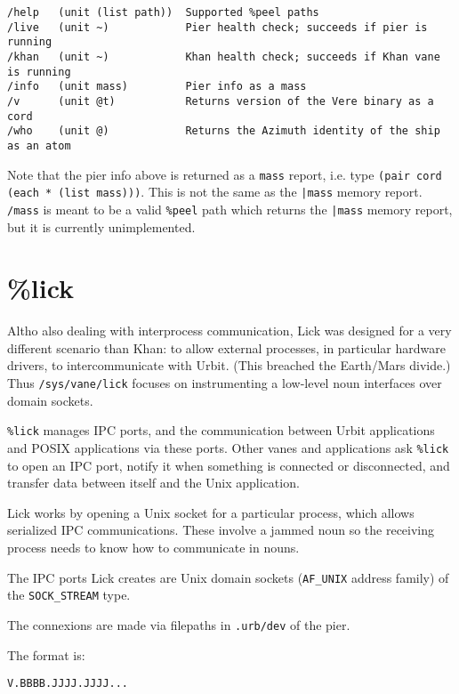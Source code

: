 \documentclass[twoside]{article}
\begin{document}
\begin{verbatim}
/help   (unit (list path))  Supported %peel paths
/live   (unit ~)            Pier health check; succeeds if pier is running
/khan   (unit ~)            Khan health check; succeeds if Khan vane is running
/info   (unit mass)         Pier info as a mass
/v      (unit @t)           Returns version of the Vere binary as a cord
/who    (unit @)            Returns the Azimuth identity of the ship as an atom
\end{verbatim}

Note that the pier info above is returned as a \texttt{mass} report, i.e. type \texttt{(pair cord (each * (list mass)))}. This is not the same as the \texttt{|mass} memory report. \texttt{/mass} is meant to be a valid \texttt{\%peel} path which returns the \texttt{|mass} memory report, but it is currently unimplemented.

\section{\%lick}

Altho also dealing with interprocess communication, Lick was designed for a very different scenario than Khan:  to allow external processes, in particular hardware drivers, to intercommunicate with Urbit.  (This breached the Earth/Mars divide.)  Thus \texttt{/sys/vane/lick} focuses on instrumenting a low-level noun interfaces over domain sockets.

\texttt{\%lick} manages IPC ports, and the communication between Urbit applications and POSIX applications via these ports. Other vanes and applications ask \texttt{\%lick} to open an IPC port, notify it when something is connected or disconnected, and transfer data between itself and the Unix application.

Lick works by opening a Unix socket for a particular process, which allows serialized IPC communications.  These involve a jammed noun so the receiving process needs to know how to communicate in nouns.

The IPC ports Lick creates are Unix domain sockets (\texttt{AF\_UNIX} address family) of the \texttt{SOCK\_STREAM} type.

The connexions are made via filepaths in \texttt{.urb/dev} of the pier.

The format is:

\begin{verbatim}
V.BBBB.JJJJ.JJJJ...
\end{verbatim}
\end{document}
